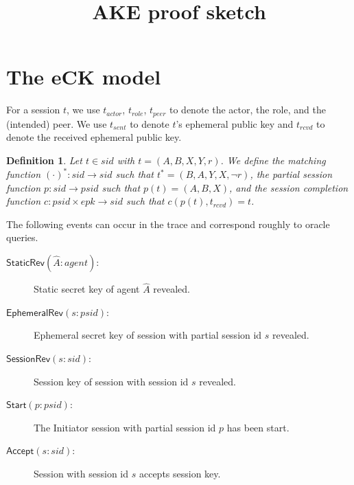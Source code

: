 \documentclass[]{article}
\newtheorem{definition}{Definition}
\begin{document}
\title{AKE proof sketch}
\author{}
\maketitle

\newcommand{\tr}{\mathit{tr}}

\newcommand{\StaticRev}{\mathsf{StaticRev}}
\newcommand{\EphemeralRev}{\mathsf{EphemeralRev}}
\newcommand{\SessionRev}{\mathsf{SessionRev}}
\newcommand{\Start}{\mathsf{Start}}
\newcommand{\Accept}{\mathsf{Accept}}
\newcommand{\Init}{\mathsf{Init_1}}
\newcommand{\Initt}{\mathsf{Init_2}}
\newcommand{\Resp}{\mathsf{Resp}}

\newcommand{\HasMatching}{\mathsf{HasMatching}}

\newcommand{\psid}{\mathit{psid}}
\newcommand{\sid}{\mathit{sid}}
\newcommand{\agent}{\mathit{agent}}
\newcommand{\epk}{\mathit{epk}}

\newcommand{\actor}[1]{#1_{\mathit{actor}}}
\newcommand{\role}[1]{#1_{\mathit{role}}}
\newcommand{\peer}[1]{#1_{\mathit{peer}}}
\newcommand{\sent}[1]{#1_{\mathit{sent}}}
\newcommand{\rcvd}[1]{#1_{\mathit{rcvd}}}
\newcommand{\isfresh}{\mathit{fresh}}

\section{The eCK model}

For a session $t$, we use $\actor{t}$, $\role{t}$, $\peer{t}$ to denote the
  actor, the role, and the (intended) peer.
We use $\sent{t}$ to denote $t$'s ephemeral public key and $\rcvd{t}$ to denote
  the received ephemeral public key.

\begin{definition}
Let $t\in \sid$ with $t=(A,B,X,Y,r)$.
We define the matching function $(\cdot)^{*} : \sid \to \sid$
  such that $t^* = (B,A,Y,X, \neg r)$,
  the partial session function $p : \sid \to \psid$ such that
  $p(t) = (A,B,X)$,
  and the session completion function
  $c : \psid \times \epk \to \sid$ such that $c(p(t), \rcvd{t}) = t$.
\end{definition}

The following events can occur in the trace and correspond roughly to oracle queries.
\begin{description}
\item[$\StaticRev(\hat{A} : \agent)$:] Static secret key of agent $\hat{A}$ revealed.
\item[$\EphemeralRev(s : \psid)$:] Ephemeral secret key of session with partial session
  id $s$ revealed.
\item[$\SessionRev(s : \sid)$:] Session key of session with session id $s$ revealed.
\item[$\Start(p : \psid)$:] The Initiator session with partial session id $p$ has
  been start.
\item[$\Accept(s : \sid)$:] Session with session id $s$ accepts session key.
\end{description}
\end{document}
